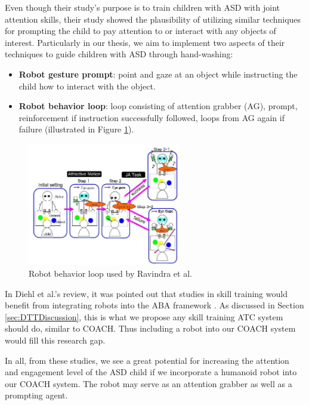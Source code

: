 \documentclass{ut-thesis}
\begin{document}
Even though their study's purpose is to train children with ASD with joint attention skills, their study showed the plausibility of utilizing similar techniques for prompting the child to pay attention to or interact with any objects of interest.  Particularly in our thesis, we aim to implement two aspects of their techniques to guide children with ASD through hand-washing:
\begin{itemize}
	\item \textbf{Robot gesture prompt}: point and gaze at an object while instructing the child how to interact with the object.
	\item \textbf{Robot behavior loop}: loop consisting of attention grabber (AG), prompt, reinforcement if instruction successfully followed, loops from AG again if failure (illustrated in Figure \ref{fig:ravindra2009therapeutic}).
\end{itemize}
\begin{figure} [H]
	\centering
	\includegraphics[width=0.6\textwidth]{./img/ravindra2009therapeutic.png}
	\caption{Robot behavior loop used by Ravindra et al. \cite{ravindra2009therapeutic}}
	\label{fig:ravindra2009therapeutic}
\end{figure}

In Diehl et al.'s review, it was pointed out that studies in skill training would benefit from integrating robots into the ABA framework \cite{diehl2012clinical}.  As discussed in Section \ref{sec:DTTDiscussion}, this is what we propose any skill training ATC system should do, similar to COACH.  Thus including a robot into our COACH system would fill this research gap.


In all, from these studies, we see a great potential for increasing the attention and engagement level of the ASD child if we incorporate a humanoid robot into our COACH system.  The robot may serve as an attention grabber as well as a prompting agent.
\end{document}
